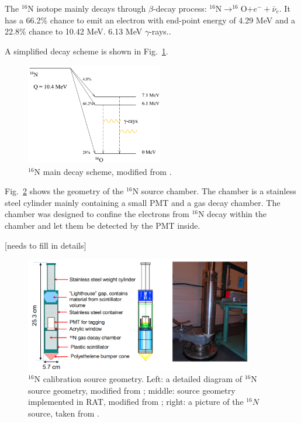 The $^{16}$N isotope mainly decays through $\beta$-decay process: $^{16}$N$\to ^{16}$O$+e^-+\bar{\nu}_e$.
It has a 66.2\% chance to emit an electron with end-point energy of 4.29 MeV and a 22.8\% chance to 
10.42 MeV. 6.13 MeV $\gamma$-rays.\cite{nndc}.

A simplified decay scheme is shown in Fig.~\ref{n16decay}.

\begin{figure}[!htb]
	\centering
	\includegraphics[width=6cm]{n16_decay.png}
	\caption{$^{16}$N main decay scheme, modified from \cite{dragowsky200216n}.}
	\label{n16decay}
\end{figure}

Fig.~\ref{n16pic} shows the geometry of the $^{16}$N source chamber. The chamber is a stainless steel cylinder mainly containing a small PMT and a gas decay chamber. The chamber was designed to confine the electrons from $^{16}$N decay within the chamber and let them be detected by the PMT inside\cite{dragowsky1999sudbury}.

[needs to fill in details]





\begin{figure}[!htb]
	\centering
	\includegraphics[width=10cm]{n16geom.png}
	\caption{$^{16}$N calibration source geometry. Left: a detailed diagram of $^{16}$N source geometry, modified from \cite{maclellan2009energy,matt_deployedsource}; middle: source geometry implemented in RAT, modified from \cite{n16geom_zach}; right: a picture of the $^{16}N$ source, taken from \cite{n16pic}.}
	\label{n16pic}
\end{figure}

